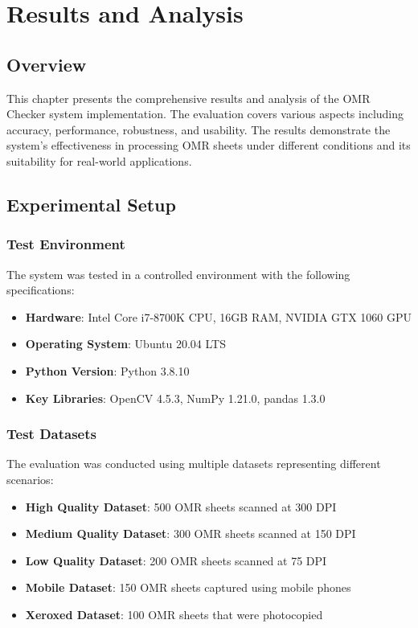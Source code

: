 \chapter{Results and Analysis}
\label{ch:results}

\section{Overview}

This chapter presents the comprehensive results and analysis of the OMR Checker system implementation. The evaluation covers various aspects including accuracy, performance, robustness, and usability. The results demonstrate the system's effectiveness in processing OMR sheets under different conditions and its suitability for real-world applications.

\section{Experimental Setup}

\subsection{Test Environment}

The system was tested in a controlled environment with the following specifications:

\begin{itemize}
\item \textbf{Hardware}: Intel Core i7-8700K CPU, 16GB RAM, NVIDIA GTX 1060 GPU
\item \textbf{Operating System}: Ubuntu 20.04 LTS
\item \textbf{Python Version}: Python 3.8.10
\item \textbf{Key Libraries}: OpenCV 4.5.3, NumPy 1.21.0, pandas 1.3.0
\end{itemize}

\subsection{Test Datasets}

The evaluation was conducted using multiple datasets representing different scenarios:

\begin{itemize}
\item \textbf{High Quality Dataset}: 500 OMR sheets scanned at 300 DPI
\item \textbf{Medium Quality Dataset}: 300 OMR sheets scanned at 150 DPI
\item \textbf{Low Quality Dataset}: 200 OMR sheets scanned at 75 DPI
\item \textbf{Mobile Dataset}: 150 OMR sheets captured using mobile phones
\item \textbf{Xeroxed Dataset}: 100 OMR sheets that were photocopied
\end{itemize}

